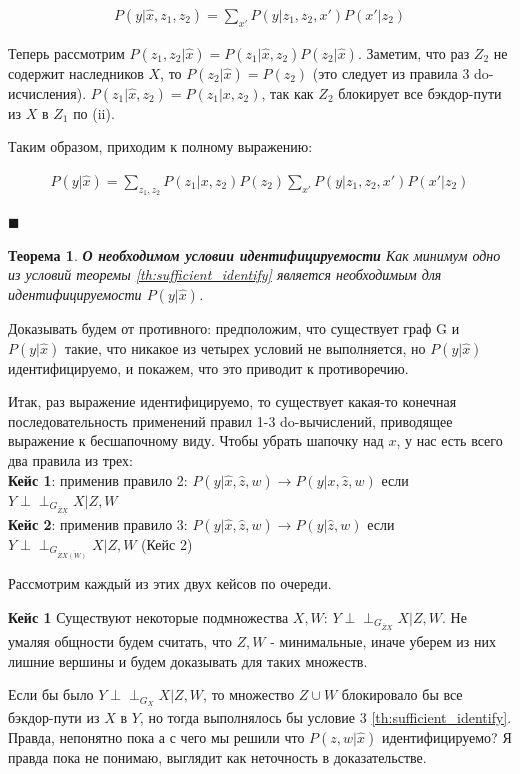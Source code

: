 \documentclass[fleqn]{article}
\newcommand{\independent}{\perp \!\!\! \perp}
\newtheorem{theorem}{Теорема}
\numberwithin{equation}{section}
\numberwithin{theorem}{section}
\numberwithin{figure}{section}
\numberwithin{lemma}{section}
\numberwithin{corollary}{section}
\begin{document}
\begin{align}
	P(y|\hat x, z_1, z_2) = \sum\limits_{x'} P(y|z_1, z_2, x')P(x'|z_2)
\end{align}

Теперь рассмотрим $P(z_1, z_2 | \hat x) = P(z_1 | \hat x, z_2) P(z_2 | \hat x)$. Заметим, что раз $Z_2$ не содержит наследников $X$, то $P(z_2|\hat x) = P(z_2)$ (это следует из правила 3 do-исчисления). $P(z_1 | \hat x, z_2) = P(z_1 |  x, z_2)$, так как  $Z_2$ блокирует все бэкдор-пути из $X$ в $Z_1$ по (ii). 

Таким образом, приходим к полному выражению:

\begin{align}
	P(y|\hat x) = \sum\limits_{z_1,z_2}P(z_1|x, z_2)P(z_2)\sum\limits_{x'} P(y|z_1, z_2, x')P(x'|z_2)
\end{align}

$\blacksquare$

\begin{theorem}
	\textbf{О необходимом условии идентифицируемости} Как минимум одно из условий теоремы \ref{th:sufficient_identify} является необходимым для идентифицируемости $P(y|\hat x)$. 
\end{theorem}

Доказывать будем от противного: предположим, что существует граф G и $P(y|\hat x)$ такие, что никакое из четырех условий не выполняется, но $P(y|\hat x)$ идентифицируемо, и покажем, что это приводит к противоречию.


Итак, раз выражение идентифицируемо, то существует какая-то конечная последовательность применений правил 1-3 do-вычислений, приводящее выражение к бесшапочному виду. Чтобы убрать шапочку над $x$, у нас есть всего два правила из трех:\\
\textbf{Кейс 1}: применив правило 2: $P(y|\hat x, \hat z, w) \to P(y|x, \hat z, w)$ если $Y \independent_{G_{\overline Z \underline{X}}} X | Z, W$ \\
\textbf{Кейс 2}: применив правило 3: $P(y|\hat x, \hat z, w) \to P(y|\hat z, w)$ если $Y \independent_{G_{\overline{Z}\overline{X(W)}}} X | Z, W$ (Кейс 2)

Рассмотрим каждый из этих двух кейсов по очереди.

\textbf{Кейс 1}
Существуют некоторые подмножества $X,W$: $Y \independent_{G_{\overline Z \underline{X}}} X | Z, W$. Не умаляя общности будем считать, что $Z, W$ - минимальные, иначе уберем из них лишние вершины и будем доказывать для таких множеств. 

Если бы было $Y \independent_{G_{\underline{X}}} X | Z, W$, то множество $Z \cup W$ блокировало бы все бэкдор-пути из $X$ в $Y$, но тогда выполнялось бы условие 3 \ref{th:sufficient_identify}. Правда, непонятно пока а с чего мы решили что $P(z,w | \hat x)$ идентифицируемо? Я правда пока не понимаю, выглядит как неточность в доказательстве. 
\end{document}
